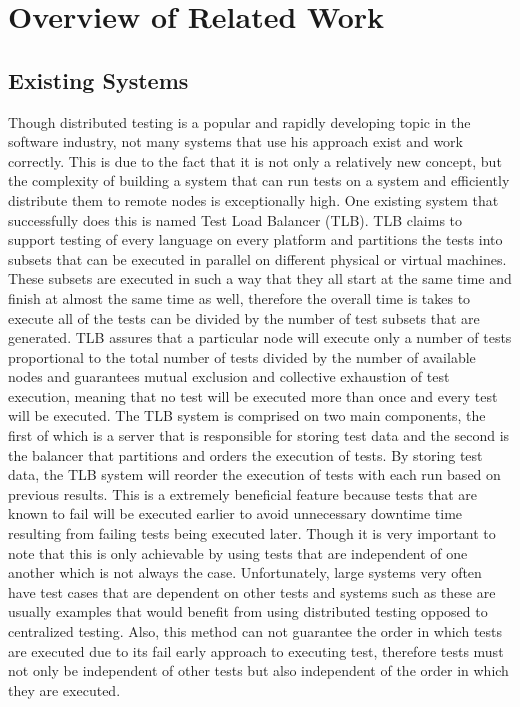 \documentclass{article}
\begin{document}
{\section{Overview of Related Work}
\label{related}
\subsection{Existing Systems}
\label{existing}

Though distributed testing is a popular and rapidly developing topic in the software industry, not many systems that use his approach exist and work correctly. This is due to the fact that it is not only a relatively new concept, but the complexity of building a system that can run tests on a system and efficiently distribute them to remote nodes is exceptionally high. One existing system that successfully does this is named Test Load Balancer (TLB). TLB claims to support testing of every language on every platform and partitions the tests into subsets that can be executed in parallel on different physical or virtual machines. These subsets are executed in such a way that they all start at the same time and finish at almost the same time as well, therefore the overall time is takes to execute all of the tests can be divided by the number of test subsets that are generated. TLB assures that a particular node will execute only a number of tests proportional to the total number of tests divided by the number of available nodes and guarantees mutual exclusion and collective exhaustion of test execution, meaning that no test will be executed more than once and every test will be executed. The TLB system is comprised on two main components, the first of which is a server that is responsible for storing test data and the second is the balancer that partitions and orders the execution of tests. By storing test data, the TLB system will reorder the execution of tests with each run based on previous results. This is a extremely beneficial feature because tests that are known to fail will be executed earlier to avoid unnecessary downtime time resulting from failing tests being executed later. Though it is very important to note that this is only achievable by using tests that are independent of one another which is not always the case. Unfortunately, large systems very often have test cases that are dependent on other tests and systems such as these are usually examples that would benefit from using distributed testing opposed to centralized testing. Also, this method can not guarantee the order in which tests are executed due to its fail early approach to executing test, therefore tests must not only be independent of other tests but also independent of the order in which they are executed.

}
\end{document}
